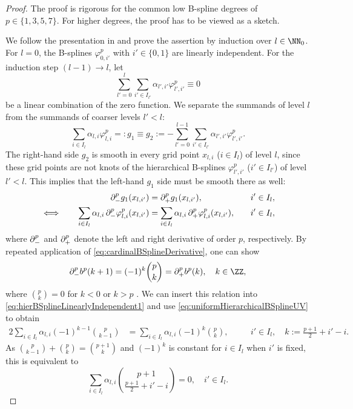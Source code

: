 \begin{proof}
  The proof is rigorous for the common low B-spline degrees of
  $p \in \{1, 3, 5, 7\}$.
  For higher degrees, the proof has to be viewed as a sketch.
  
  We follow the presentation in \cite{Valentin16Hierarchical} and
  prove the assertion by induction over $l \in \NN_0$.
  For $l = 0$, the B-splines $\varphi_{0,i'}^p$ with $i' \in \{0, 1\}$
  are linearly independent.
  For the induction step $(l-1) \to l$, let
  \begin{equation}
    \sum_{l'=0}^l \sum_{i' \in I_{l'}} \alpha_{l',i'} \varphi_{l',i'}^p
    \equiv 0
  \end{equation}
  be a linear combination of the zero function.
  We separate the summands of level $l$
  from the summands of coarser levels $l' < l$:
  \begin{equation}
    \label{eq:hierBSplineLinearlyIndependent3}
    \sum_{i \in I_l} \alpha_{l,i} \varphi_{l,i}^p
    =: g_1 \equiv g_2 :=
    -\sum_{l'=0}^{l-1} \sum_{i' \in I_{l'}} \alpha_{l',i'} \varphi_{l',i'}^p.
  \end{equation}
  The right-hand side $g_2$ is smooth in every grid point
  $x_{l,i}$ ($i \in I_l$) of level $l$,
  since these grid points are not knots of the hierarchical B-splines
  $\varphi_{l',i'}^p$ ($i' \in I_{l'}$) of level $l' < l$.
  This implies that the left-hand $g_1$ side must be smooth there as well:
  \begin{alignat}{3}
    &&
    \mathop{}\!\partial_-^p g_1(x_{l,i'})
    &= \mathop{}\!\partial_+^p g_1(x_{l,i'}),\quad
    &&i' \in I_l,\\
    \label{eq:hierBSplineLinearlyIndependent1}
    \iff\quad&&
    \sum_{i \in I_l} \alpha_{l,i}
    \mathop{}\!\partial_-^p \varphi_{l,i}^p(x_{l,i'})
    &= \sum_{i \in I_l} \alpha_{l,i}
    \mathop{}\!\partial_+^p \varphi_{l,i}^p(x_{l,i'}),\quad
    &&i' \in I_l,
  \end{alignat}
  where $\mathop{}\!\partial_-^p$ and $\mathop{}\!\partial_+^p$ denote the left and right
  derivative of order $p$, respectively.
  By repeated application of \eqref{eq:cardinalBSplineDerivative},
  one can show
  \begin{equation}
    \partialdiff_-^p b^p(k + 1)
    = (-1)^k \binom{p}{k}
    = \partialdiff_+^p b^p(k),\quad
    k \in \ZZ,
  \end{equation}
  where $\binom{p}{k} = 0$ for $k < 0$ or $k > p$
  \cite{Hoellig13Approximation}.
  We can insert this relation into
  \eqref{eq:hierBSplineLinearlyIndependent1}
  and use \eqref{eq:uniformHierarchicalBSplineUV} to obtain
  \begin{alignat}{2}
    \sum_{i \in I_l} \alpha_{l,i} (-1)^{k-1} \binom{p}{k-1}
    &= \sum_{i \in I_l} \alpha_{l,i} (-1)^k \binom{p}{k},\quad
    &&i' \in I_l,\quad
    k := \frac{p+1}{2} + i' - i.
  \end{alignat}
  As $\binom{p}{k-1} + \binom{p}{k} = \binom{p+1}{k}$
  and $(-1)^k$ is constant for $i \in I_l$ when $i'$ is fixed,
  this is equivalent to
  \begin{equation}
    \label{eq:hierBSplineLinearlyIndependent2}
    \sum_{i \in I_l} \alpha_{l,i}
    \binom{p+1}{\frac{p+1}{2} + i' - i} = 0,\quad
    i' \in I_l.
  \end{equation}
  

\end{proof}
